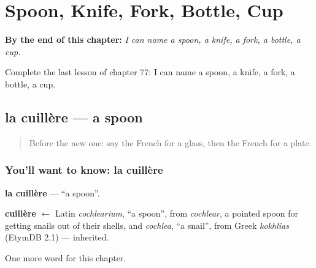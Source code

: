 
\chapter{Spoon, Knife, Fork, Bottle, Cup}
\label{ch:fr-spoon-knife-fork-bottle-cup}

\begin{chapteropening}
\textbf{By the end of this chapter:} \emph{I can name a spoon, a knife, a fork, a bottle, a cup.}

Complete the last lesson of chapter 77: I can name a spoon, a knife, a fork, a bottle, a cup.
\end{chapteropening}

\section[la cuillère]{la cuillère — a spoon}

\label{lesson:FR-C77-cuillere}



\begin{quote}
Before the new one: say the French for a glass, then the French for a plate.
\end{quote}

\subsection*{You'll want to know: la cuillère}
\textbf{la cuillère} — \textquotedblleft{}a spoon\textquotedblright{}.

\begin{cousinweb}
\textbf{cuillère} $\leftarrow$ Latin \emph{cochlearium}, \textquotedblleft{}a spoon\textquotedblright{}, from \emph{cochlear}, a pointed spoon for getting snails out of their shells, and \emph{cochlea}, \textquotedblleft{}a snail\textquotedblright{}, from Greek \emph{kokhlias} (EtymDB 2.1) — inherited.
\end{cousinweb}

\begin{grammarlens}[title={What you've built}]
One more word for this chapter.
\end{grammarlens}

